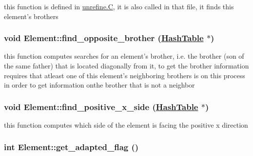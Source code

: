 this function is defined in \hyperlink{constant_8h_a21}{unrefine.C}, it is also called in that file, it finds this element's brothers 

\hypertarget{classElement_a62}{
\subsubsection[find\_\-opposite\_\-brother]{\setlength{\rightskip}{0pt plus 5cm}void Element::find\_\-opposite\_\-brother (\hyperlink{classHashTable}{Hash\-Table} $\ast$)}}
\label{classElement_a62}


this function computes searches for an element's brother, i.e. the brother (son of the same father) that is located diagonally from it, to get the brother information requires that atleast one of this element's neighboring brothers is on this process in order to get information onthe brother that is not a neighbor 

\hypertarget{classElement_a69}{
\subsubsection[find\_\-positive\_\-x\_\-side]{\setlength{\rightskip}{0pt plus 5cm}void Element::find\_\-positive\_\-x\_\-side (\hyperlink{classHashTable}{Hash\-Table} $\ast$)}}
\label{classElement_a69}


this function computes which side of the element is facing the positive x direction 

\hypertarget{classElement_a34}{
\subsubsection[get\_\-adapted\_\-flag]{\setlength{\rightskip}{0pt plus 5cm}int Element::get\_\-adapted\_\-flag ()}}
\label{classElement_a34}


